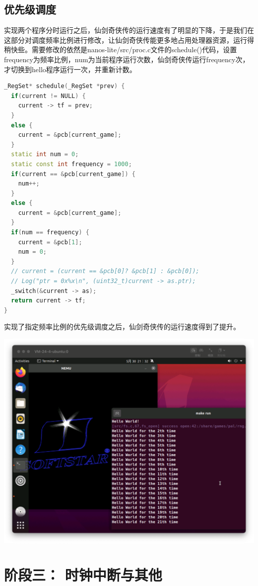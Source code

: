 \documentclass[UTF8,a4paper,10pt]{ctexart}
\begin{document}
\subsection{优先级调度}
实现两个程序分时运行之后，仙剑奇侠传的运行速度有了明显的下降，于是我们在这部分对调度频率比例进行修改，让仙剑奇侠传能更多地占用处理器资源，运行得稍快些。需要修改的依然是nanos-lite/src/proc.c文件的schedule()代码，设置frequency为频率比例，num为当前程序运行次数，仙剑奇侠传运行frequency次，才切换到hello程序运行一次，并重新计数。
\begin{lstlisting}[language = C++]
_RegSet* schedule(_RegSet *prev) {
  if(current != NULL) {
    current -> tf = prev;
  }
  else {
    current = &pcb[current_game];
  }
  static int num = 0;
  static const int frequency = 1000;
  if(current == &pcb[current_game]) {
    num++;
  }
  else {
    current = &pcb[current_game];
  }
  if(num == frequency) {
    current = &pcb[1];
    num = 0;
  }
  // current = (current == &pcb[0]? &pcb[1] : &pcb[0]);
  // Log("ptr = 0x%x\n", (uint32_t)current -> as.ptr);
  _switch(&current -> as);
  return current -> tf;
}
\end{lstlisting}
实现了指定频率比例的优先级调度之后，仙剑奇侠传的运行速度得到了提升。
\begin{center}
  \includegraphics*[scale = 0.3]{img/12}
\end{center}

\section{阶段三： 时钟中断与其他}
\end{document}

